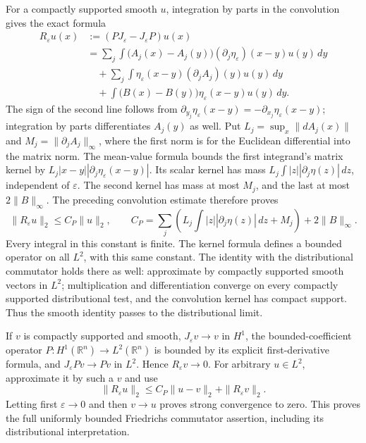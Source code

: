 \documentclass[
  11pt,
]{article}
\begin{document}
For a compactly supported smooth \(u\), integration by parts in the
convolution gives the exact formula \[
\begin{aligned}
R_\varepsilon u(x)
&:=(PJ_\varepsilon-J_\varepsilon P)u(x)\\
&=\sum_j\int
\big(A_j(x)-A_j(y)\big)
(\partial_j\eta_\varepsilon)(x-y)u(y)\,dy\\
&\quad+\sum_j\int
\eta_\varepsilon(x-y)(\partial_jA_j)(y)u(y)\,dy\\
&\quad+\int
\big(B(x)-B(y)\big)\eta_\varepsilon(x-y)u(y)\,dy .
\end{aligned}
\] The sign of the second line follows from
\(\partial_{y_j}\eta_\varepsilon(x-y)=-\partial_{x_j}\eta_\varepsilon(x-y)\);
integration by parts differentiates \(A_j(y)\) as well. Put
\(L_j=\sup_x\|dA_j(x)\|\) and \(M_j=\|\partial_jA_j\|_\infty\), where
the first norm is for the Euclidean differential into the matrix norm.
The mean-value formula bounds the first integrand's matrix kernel by
\(L_j|x-y||\partial_j\eta_\varepsilon(x-y)|\). Its scalar kernel has
mass \(L_j\int |z||\partial_j\eta(z)|\,dz\), independent of
\(\varepsilon\). The second kernel has mass at most \(M_j\), and the
last at most \(2\|B\|_\infty\). The preceding convolution estimate
therefore proves \[
\|R_\varepsilon u\|_2\leq C_P\|u\|_2,\qquad
C_P=\sum_j\left(
L_j\int |z||\partial_j\eta(z)|\,dz+M_j\right)
+2\|B\|_\infty .
\] Every integral in this constant is finite. The kernel formula defines
a bounded operator on all \(L^2\), with this same constant. The identity
with the distributional commutator holds there as well: approximate by
compactly supported smooth vectors in \(L^2\); multiplication and
differentiation converge on every compactly supported distributional
test, and the convolution kernel has compact support. Thus the smooth
identity passes to the distributional limit.

If \(v\) is compactly supported and smooth, \(J_\varepsilon v\to v\) in
\(H^1\), the bounded-coefficient operator
\(P:H^1(\mathbb R^n)\to L^2(\mathbb R^n)\) is bounded by its explicit
first-derivative formula, and \(J_\varepsilon Pv\to Pv\) in \(L^2\).
Hence \(R_\varepsilon v\to0\). For arbitrary \(u\in L^2\), approximate
it by such a \(v\) and use \[
\|R_\varepsilon u\|_2
\leq C_P\|u-v\|_2+\|R_\varepsilon v\|_2 .
\] Letting first \(\varepsilon\to0\) and then \(v\to u\) proves strong
convergence to zero. This proves the full uniformly bounded Friedrichs
commutator assertion, including its distributional interpretation.
\end{document}
